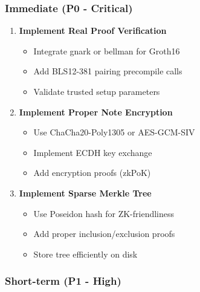 \documentclass[
]{article}
\providecommand{\tightlist}{%
  \setlength{\itemsep}{0pt}\setlength{\parskip}{0pt}}
\begin{document}
\subsubsection{Immediate (P0 - Critical)}\label{immediate-p0---critical}

\begin{enumerate}
\def\labelenumi{\arabic{enumi}.}
\item
  \textbf{Implement Real Proof Verification}

  \begin{itemize}
  \tightlist
  \item
    Integrate gnark or bellman for Groth16
  \item
    Add BLS12-381 pairing precompile calls
  \item
    Validate trusted setup parameters
  \end{itemize}
\item
  \textbf{Implement Proper Note Encryption}

  \begin{itemize}
  \tightlist
  \item
    Use ChaCha20-Poly1305 or AES-GCM-SIV
  \item
    Implement ECDH key exchange
  \item
    Add encryption proofs (zkPoK)
  \end{itemize}
\item
  \textbf{Implement Sparse Merkle Tree}

  \begin{itemize}
  \tightlist
  \item
    Use Poseidon hash for ZK-friendliness
  \item
    Add proper inclusion/exclusion proofs
  \item
    Store tree efficiently on disk
  \end{itemize}
\end{enumerate}

\subsubsection{Short-term (P1 - High)}\label{short-term-p1---high}
\end{document}
